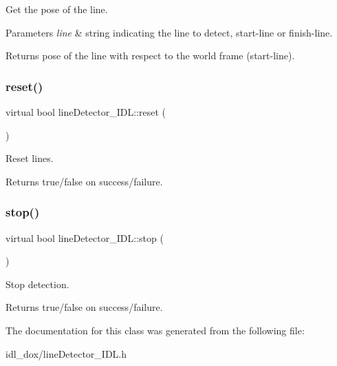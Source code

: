 Get the pose of the line. 


\begin{DoxyParams}{Parameters}
{\em line} & string indicating the line to detect, start-\/line or finish-\/line. \\
\hline
\end{DoxyParams}
\begin{DoxyReturn}{Returns}
pose of the line with respect to the world frame (start-\/line). 
\end{DoxyReturn}
\mbox{\label{classlineDetector__IDL_a665153eb57fa761fe6dd9ae741169f7b}} 
\subsubsection{\texorpdfstring{reset()}{reset()}}
{\footnotesize\ttfamily virtual bool line\+Detector\+\_\+\+I\+D\+L\+::reset (\begin{DoxyParamCaption}{ }\end{DoxyParamCaption})\hspace{0.3cm}{\ttfamily [virtual]}}



Reset lines. 

\begin{DoxyReturn}{Returns}
true/false on success/failure. 
\end{DoxyReturn}
\mbox{\label{classlineDetector__IDL_ab2905809969a72d0d835b9ea685150ba}} 
\subsubsection{\texorpdfstring{stop()}{stop()}}
{\footnotesize\ttfamily virtual bool line\+Detector\+\_\+\+I\+D\+L\+::stop (\begin{DoxyParamCaption}{ }\end{DoxyParamCaption})\hspace{0.3cm}{\ttfamily [virtual]}}



Stop detection. 

\begin{DoxyReturn}{Returns}
true/false on success/failure. 
\end{DoxyReturn}


The documentation for this class was generated from the following file\+:\begin{DoxyCompactItemize}
\item 
idl\+\_\+dox/line\+Detector\+\_\+\+I\+D\+L.\+h\end{DoxyCompactItemize}
